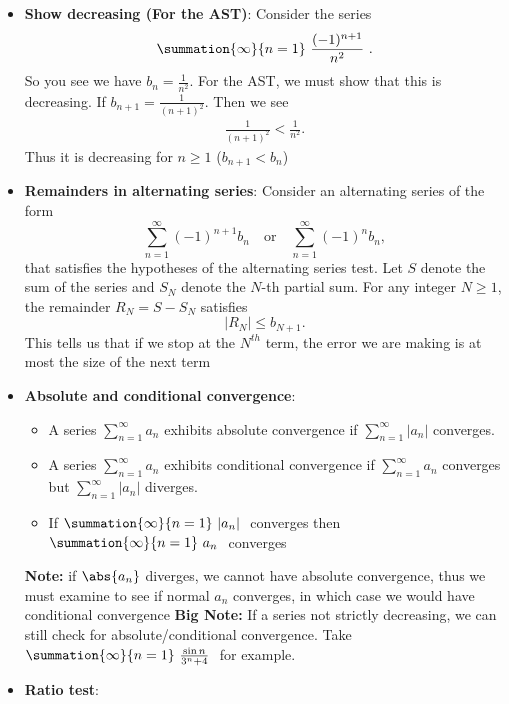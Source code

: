 \documentclass{report}
\begin{document}
\begin{itemize}
\item \textbf{Show decreasing (For the AST)}: Consider the series
    \begin{align*}
        \summation{\infty}{n=1}\ \frac{(-1)^{n+1}}{n^{2}}\ 
    .\end{align*}
    \bigbreak \noindent 
    So you see we have $b_{n}=  \frac{1}{n^{2}}$. For the AST, we must show that this is decreasing. If $b_{n+1} = \frac{1}{(n+1)^{2}}$. Then we see
    \begin{align*}
        \frac{1}{(n+1)^{2}} < \frac{1}{n^{2}}
    .\end{align*}
    \bigbreak \noindent 
    Thus it is decreasing for $n \geq 1$ ($b_{n+1} < b_{n}$)
    \blacksquare
\item \textbf{Remainders in alternating series}:
    Consider an alternating series of the form
    \[
        \sum_{n=1}^{\infty} (-1)^{n+1} b_n \quad \text{or} \quad \sum_{n=1}^{\infty} (-1)^n b_n,
    \]
    that satisfies the hypotheses of the alternating series test. Let \( S \) denote the sum of the series and \( S_N \) denote the \( N \)-th partial sum. For any integer \( N \geq 1 \), the remainder \( R_N = S - S_N \) satisfies
    \[
        \lvert R_N \rvert \leq b_{N+1}.
    \]
    This tells us that if we stop at the $N^{th}$ term, the error we are making is at most the size of the next term
\item \textbf{Absolute and conditional convergence}:
    \begin{itemize}
        \item A series \(\sum_{n=1}^{\infty} a_n\) exhibits absolute convergence if \(\sum_{n=1}^{\infty} |a_n|\) converges.
        \item A series \(\sum_{n=1}^{\infty} a_n\) exhibits conditional convergence if \(\sum_{n=1}^{\infty} a_n\) converges but \(\sum_{n=1}^{\infty} |a_n|\) diverges.
        \item If $\summation{\infty}{n=1}\ \lvert a_{n} \rvert\ $ converges then $\summation{\infty}{n=1}\ a_{n}\ $ converges
    \end{itemize}
    \bigbreak \noindent 
    \textbf{Note:} if $\abs{a_{n}}$ diverges, we cannot have absolute convergence, thus we must examine to see if normal $a_{n}$ converges, in which case we would have conditional convergence
    \bigbreak \noindent 
    \textbf{Big Note:} If a series not strictly decreasing, we can still check for absolute/conditional convergence. Take $\summation{\infty}{n=1}\ \frac{\sin{n}}{3^{n} + 4}\  $ for example.
\item \textbf{Ratio test}:

\end{itemize}
\end{document}

